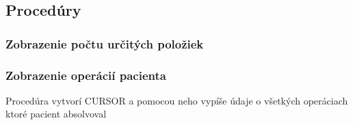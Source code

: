 \subsection{Procedúry}

\subsubsection{Zobrazenie počtu určitých položiek}

\subsubsection{Zobrazenie operácií pacienta}
Procedúra vytvorí CURSOR a pomocou neho vypíše údaje o všetkých operáciach ktoré pacient absolvoval